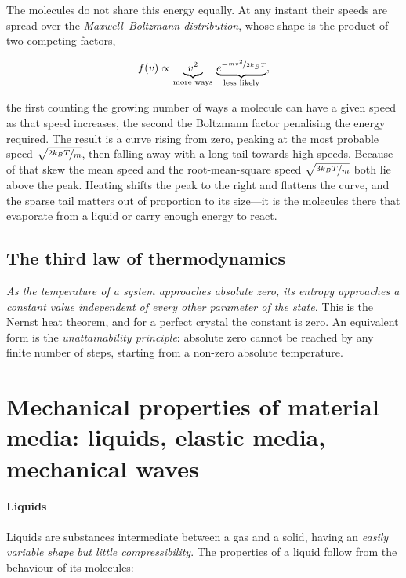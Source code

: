         The molecules do not share this energy equally. At any instant their speeds are spread over the \emph{Maxwell--Boltzmann distribution}, whose shape is the product of two competing factors,

        \begin{equation}\label{eq:maxwell-boltzmann}
            f(v) \propto \underbrace{v^{2}}_{\text{more ways}} \, \underbrace{e^{-\nicefrac{mv^{2}}{2\kB T}}}_{\text{less likely}} ,
        \end{equation}

        the first counting the growing number of ways a molecule can have a given speed as that speed increases, the second the Boltzmann factor penalising the energy required. The result is a curve rising from zero, peaking at the most probable speed $\sqrt{\nicefrac{2k_{B} T}{m}}$, then falling away with a long tail towards high speeds. Because of that skew the mean speed and the root-mean-square speed $\sqrt{\nicefrac{3k_{B} T}{m}}$ both lie above the peak. Heating shifts the peak to the right and flattens the curve, and the sparse tail matters out of proportion to its size---it is the molecules there that evaporate from a liquid or carry enough energy to react.

    \subsection{The third law of thermodynamics}

        \textit{As the temperature of a system approaches absolute zero, its entropy approaches a constant value independent of every other parameter of the state.} This is the Nernst heat theorem, and for a perfect crystal the constant is zero. An equivalent form is the \emph{unattainability principle}: absolute zero cannot be reached by any finite number of steps, starting from a non-zero absolute temperature.

\section{Mechanical properties of material media: liquids, elastic media, mechanical waves}
\label{sec:mechanical-media}

    \paragraph{Liquids}

        Liquids are substances intermediate between a gas and a solid, having an \emph{easily variable shape but little compressibility}. The properties of a liquid follow from the behaviour of its molecules:

